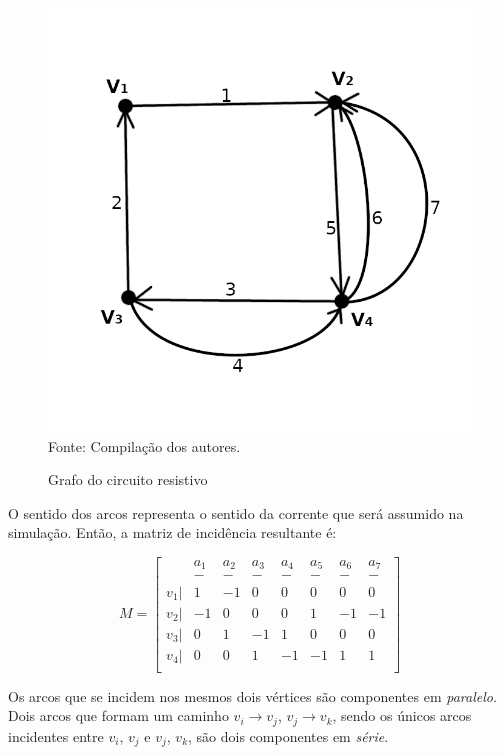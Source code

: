 \documentclass[twocolumn, 10pt,a4paper]{extarticle}
\begin{document}
\begin{figure}[H]
	\caption{Grafo do circuito resistivo} 
	\centering
	\includegraphics[scale=1]{grcrc1}
	\\ Fonte: Compilação dos autores.
\end{figure}

O sentido dos arcos representa o sentido da corrente que será assumido na simulação. Então, a matriz de incidência resultante é:

\[
M = 
\begin{bmatrix}
 & a_1 & a_2 & a_3 & a_4 & a_5 & a_6 & a_7 \\
 & - & - & - & - & - & - & - \\
 v_1 |& 1  & -1 & 0  & 0  & 0  & 0  & 0  \\
 v_2 |& -1 & 0  & 0  & 0  & 1  & -1 & -1 \\
 v_3 |& 0  & 1  & -1 & 1  & 0  & 0  & 0  \\
 v_4 |& 0  & 0  & 1  & -1 & -1 & 1  & 1  \\
\end{bmatrix}
\]

Os arcos que se incidem nos mesmos dois vértices são componentes em \textit{paralelo}. Dois arcos que formam um caminho $v_i \to v_j$, $v_j \to v_k$, sendo os únicos arcos incidentes entre $v_i$, $v_j$ e $v_j$, $v_k$, são dois componentes em \textit{série}.
\end{document}
